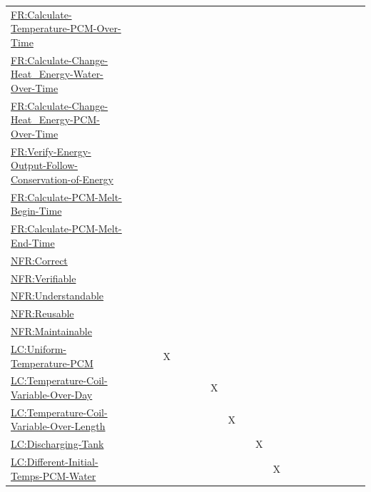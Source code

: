 \documentclass[12pt]{article}
\begin{document}
\begin{longtable}{l l l l l l l l l l l l l l l l l l l l l}
\\
\hyperref[calcTempPCMOverTime]{FR:Calculate-Temperature-PCM-Over-Time} &  &  &  &  &  &  &  &  &  &  &  &  &  &  &  &  &  &  &  & 
\\
\hyperref[calcChgHeatEnergyWtrOverTime]{FR:Calculate-Change-Heat\_Energy-Water-Over-Time} &  &  &  &  &  &  &  &  &  &  &  &  &  &  &  &  &  &  &  & 
\\
\hyperref[calcChgHeatEnergyPCMOverTime]{FR:Calculate-Change-Heat\_Energy-PCM-Over-Time} &  &  &  &  &  &  &  &  &  &  &  &  &  &  &  &  &  &  &  & 
\\
\hyperref[verifyEnergyOutput]{FR:Verify-Energy-Output-Follow-Conservation-of-Energy} &  &  &  &  &  &  &  &  &  &  &  &  &  &  &  &  &  &  &  & 
\\
\hyperref[calcPCMMeltBegin]{FR:Calculate-PCM-Melt-Begin-Time} &  &  &  &  &  &  &  &  &  &  &  &  &  &  &  &  &  &  &  & 
\\
\hyperref[calcPCMMeltEnd]{FR:Calculate-PCM-Melt-End-Time} &  &  &  &  &  &  &  &  &  &  &  &  &  &  &  &  &  &  &  & 
\\
\hyperref[correct]{NFR:Correct} &  &  &  &  &  &  &  &  &  &  &  &  &  &  &  &  &  &  &  & 
\\
\hyperref[verifiable]{NFR:Verifiable} &  &  &  &  &  &  &  &  &  &  &  &  &  &  &  &  &  &  &  & 
\\
\hyperref[understandable]{NFR:Understandable} &  &  &  &  &  &  &  &  &  &  &  &  &  &  &  &  &  &  &  & 
\\
\hyperref[reusable]{NFR:Reusable} &  &  &  &  &  &  &  &  &  &  &  &  &  &  &  &  &  &  &  & 
\\
\hyperref[maintainable]{NFR:Maintainable} &  &  &  &  &  &  &  &  &  &  &  &  &  &  &  &  &  &  &  & 
\\
\hyperref[likeChgUTP]{LC:Uniform-Temperature-PCM} &  &  &  & X &  &  &  &  &  &  &  &  &  &  &  &  &  &  &  & 
\\
\hyperref[likeChgTCVOD]{LC:Temperature-Coil-Variable-Over-Day} &  &  &  &  &  &  &  & X &  &  &  &  &  &  &  &  &  &  &  & 
\\
\hyperref[likeChgTCVOL]{LC:Temperature-Coil-Variable-Over-Length} &  &  &  &  &  &  &  &  & X &  &  &  &  &  &  &  &  &  &  & 
\\
\hyperref[likeChgDT]{LC:Discharging-Tank} &  &  &  &  &  &  &  &  &  &  & X &  &  &  &  &  &  &  &  & 
\\
\hyperref[likeChgDITPW]{LC:Different-Initial-Temps-PCM-Water} &  &  &  &  &  &  &  &  &  &  &  & X &  &  &  &  &  &  &  & 
\\

\end{longtable}
\end{document}
